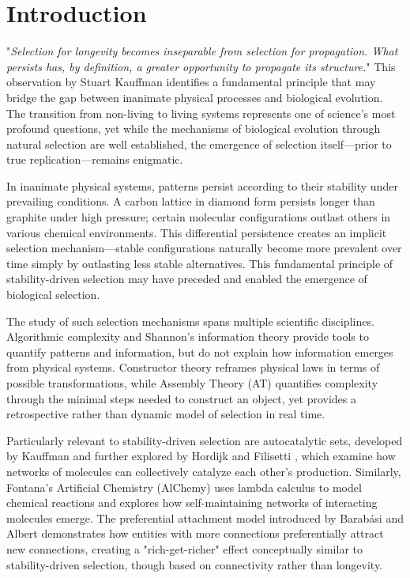 \documentclass[preprint,12pt]{elsarticle}
\begin{document}

\section{Introduction}

"\textit{Selection for longevity becomes inseparable from selection for propagation. What persists has, by definition, a greater opportunity to propagate its structure.}" This observation by Stuart Kauffman \cite{kauffman1995home} identifies a fundamental principle that may bridge the gap between inanimate physical processes and biological evolution. The transition from non-living to living systems represents one of science's most profound questions, yet while the mechanisms of biological evolution through natural selection are well established, the emergence of selection itself—prior to true replication—remains enigmatic.

In inanimate physical systems, patterns persist according to their stability under prevailing conditions. A carbon lattice in diamond form persists longer than graphite under high pressure; certain molecular configurations outlast others in various chemical environments. This differential persistence creates an implicit selection mechanism—stable configurations naturally become more prevalent over time simply by outlasting less stable alternatives. This fundamental principle of stability-driven selection may have preceded and enabled the emergence of biological selection.

The study of such selection mechanisms spans multiple scientific disciplines. Algorithmic complexity \cite{kolmogorov1965complexity} and Shannon's information theory \cite{shannon1948mathematical} provide tools to quantify patterns and information, but do not explain how information emerges from physical systems. Constructor theory \cite{deutsch2013constructor} reframes physical laws in terms of possible transformations, while Assembly Theory (AT) \cite{walker2023nature} quantifies complexity through the minimal steps needed to construct an object, yet provides a retrospective rather than dynamic model of selection in real time.

Particularly relevant to stability-driven selection are autocatalytic sets, developed by Kauffman \cite{kauffman1986autocatalytic} and further explored by Hordijk and Filisetti \cite{hordijk2011required}, which examine how networks of molecules can collectively catalyze each other's production. Similarly, Fontana's Artificial Chemistry (AlChemy) \cite{fontana1991algorithmic} uses lambda calculus to model chemical reactions and explores how self-maintaining networks of interacting molecules emerge. The preferential attachment model introduced by Barabási and Albert \cite{barabasi1999emergence} demonstrates how entities with more connections preferentially attract new connections, creating a "rich-get-richer" effect conceptually similar to stability-driven selection, though based on connectivity rather than longevity.
\end{document}
